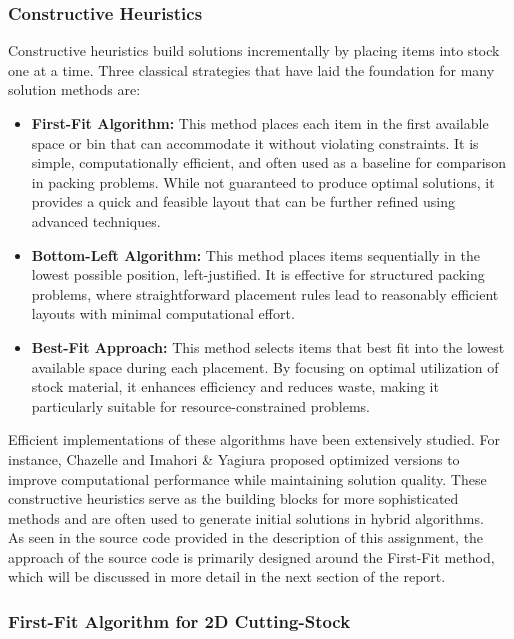 \documentclass[a4paper]{article}
\begin{document}
    \subsubsection{Constructive Heuristics}
    Constructive heuristics build solutions incrementally by placing items into stock one at a time. Three classical strategies that have laid the foundation for many solution methods are:  
    \begin{itemize}
        \item \textbf{First-Fit Algorithm:} This method places each item in the first available space or bin that can accommodate it without violating constraints. It is simple, computationally efficient, and often used as a baseline for comparison in packing problems. While not guaranteed to produce optimal solutions, it provides a quick and feasible layout that can be further refined using advanced techniques.  
        \item \textbf{Bottom-Left Algorithm:} This method places items sequentially in the lowest possible position, left-justified. It is effective for structured packing problems, where straightforward placement rules lead to reasonably efficient layouts with minimal computational effort.  
        \item \textbf{Best-Fit Approach:} This method selects items that best fit into the lowest available space during each placement. By focusing on optimal utilization of stock material, it enhances efficiency and reduces waste, making it particularly suitable for resource-constrained problems.  
    \end{itemize}  
    Efficient implementations of these algorithms have been extensively studied. For instance, Chazelle and Imahori \& Yagiura proposed optimized versions to improve computational performance while maintaining solution quality. These constructive heuristics serve as the building blocks for more sophisticated methods and are often used to generate initial solutions in hybrid algorithms.
    \vspace{0.2cm}\\
    As seen in the source code provided in the description of this assignment, the approach of the source code is primarily designed around the First-Fit method, which will be discussed in more detail in the next section of the report.
    
    \subsubsection{First-Fit Algorithm for 2D Cutting-Stock}
\end{document}
